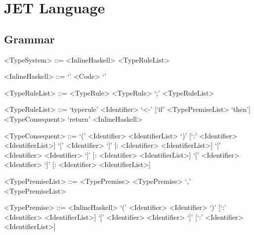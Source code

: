 
\appendix
\appendixpage
\chapter{JET Language}
\label{appendix:jetLanguage}
\section{Grammar}
\begin{grammar}
    <TypeSystem> ::= <InlineHaskell> <TypeRuleList>
    
    <InlineHaskell> ::= `{' <Code> `}'

    <TypeRuleList> ::= <TypeRule> \alt <TypeRule> `;' <TypeRuleList>

    <TypeRuleList> ::= `typerule' <Identifier> `<-' [`if' <TypePremiseList> `then'] <TypeConsequent> `return' <InlineHaskell>

    <TypeConsequent> ::= `(' <Identifier> <IdentifierList> `)' [`:' <Identifier> <IdentifierList>]
        \alt `[' <Identifier> `]' [: <Identifier> <IdentifierList>]
        \alt `[' <Identifier> <Identifier> `]' [: <Identifier> <IdentifierList>]
        \alt `[' <Identifier> <Identifier> `]' [: <Identifier> <IdentifierList>]

    <TypePremiseList> ::= <TypePremise> \alt <TypePremise> `,' <TypePremiseList>

    <TypePremise> ::= <InlineHaskell>
        \alt `(' <Identifier> <Identifier> `)' [`:' <Identifier> <IdentifierList>]
        \alt `[' <Identifier> <Identifier> `]' [`:' <Identifier> <IdentifierList>]
\end{grammar}
